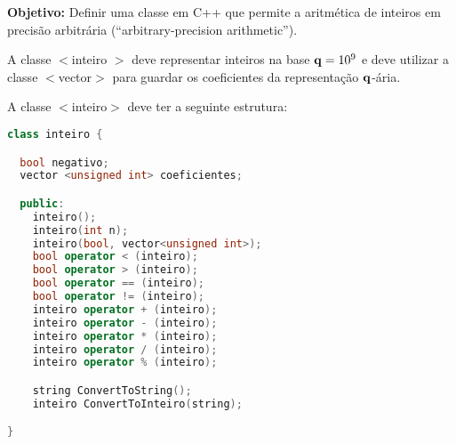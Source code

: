 
\usepackage{hyperref}
\newcommand{\shift}[1]{\setlength{\leftskip}{15 mm}{#1}\medskip}





\nextsect


{\bf Objetivo:} Definir uma classe em C++ que permite a aritmética de inteiros em precisão arbitrária (``arbitrary-precision arithmetic'').

 A classe $<$inteiro $>$ deve representar inteiros na base $\mathbf{q}=10^9$ e deve 
utilizar a classe $<$vector$>$ para guardar os coeficientes da representação $\mathbf{q}$-ária.

A classe $<$inteiro$>$ deve ter a seguinte estrutura:

\begin{lstlisting}[language=C++]
class inteiro {

  bool negativo; 
  vector <unsigned int> coeficientes;

  public:
    inteiro();
    inteiro(int n);
    inteiro(bool, vector<unsigned int>);
    bool operator < (inteiro);
    bool operator > (inteiro);
    bool operator == (inteiro);
    bool operator != (inteiro);
    inteiro operator + (inteiro);
    inteiro operator - (inteiro);
    inteiro operator * (inteiro);
    inteiro operator / (inteiro);
    inteiro operator % (inteiro);

    string ConvertToString();
    inteiro ConvertToInteiro(string);

}
\end{lstlisting}


